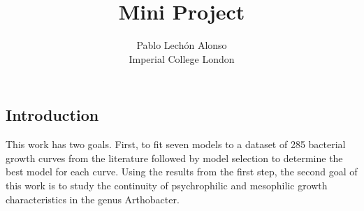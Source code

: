 \documentclass[titlepage,11pt]{article}
\begin{document}
\title{Mini Project}
\author{Pablo Lechón Alonso \\ 
			Imperial College London}
\date{}%

\maketitle
\begin{linenumbers}
    \section{Introduction}
	This work has two goals. First, to fit seven models to a dataset of 285 bacterial growth curves from the literature \cite{Bae2014, Bernhardt2018, Galarz2016, Gill1991, Phillips1987, ROTH1962, DaSilva2018, Sivonen1990, Stannard1985, Zwietering1994} followed by model selection to determine the best model for each curve. Using the results from the first step, the second goal of this work is to study the continuity of psychrophilic and mesophilic growth characteristics in the genus Arthobacter.\\
	

\end{linenumbers}
\end{document}
